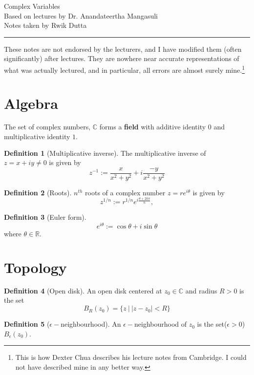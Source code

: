 \documentclass[10pt, a4paper]{extarticle}
\theoremstyle{definition}
\newtheorem{defn}{Definition}
\begin{document}
	\begin{center}
		\fontsize{25}{60}\selectfont Complex Variables \\
		\large Based on lectures by Dr. Anandateertha Mangasuli\\
		Notes taken by Rwik Dutta
	\end{center}
	\hrule
	\begin{center}
		These notes are not endorsed by the lecturers, and I have modified them (often
significantly) after lectures. They are nowhere near accurate representations of what
was actually lectured, and in particular, all errors are almost surely mine.\footnote[1]{This is how Dexter Chua describes his lecture notes from Cambridge. I could not have described mine in any better way.}
	\end{center}
	\tableofcontents
	
	\newpage

	\section{Algebra}
	The set of complex numbers, $\mathbb{C}$ forms a \textbf{field} with additive identity $0$ and multiplicative identity $1$.
	
	\begin{defn}[Multiplicative inverse]
	The multiplicative inverse of $z=x+iy\neq 0$ is given by
	\[z^{-1}:=\frac{x}{x^2+y^2}+i\frac{-y}{x^2+y^2}\]
	\end{defn}
	
	\begin{defn}[Roots]
	$n^{th}$ roots of a complex number $z=re^{i\theta}$ is given by
	\[z^{1/n}:=r^{1/n}e^{i\frac{\theta+2k\pi}{n}},\tag*{($k\in \langle n\rangle)$}\]
	\end{defn}
	
	\begin{defn}[Euler form]
		\[e^{i\theta}:=\cos\theta+i\sin\theta\]
		where $\theta\in\mathbb{R}$.
	\end{defn}

	\section{Topology}
	\begin{defn}[Open disk]
		An open disk centered at $z_0\in\mathbb{C}$ and radius $R>0$ is the set
		\[B_R(z_0)=\{z\ |\ |z-z_0|< R\}\]
	\end{defn}
	
	\begin{defn}[$\epsilon-$neighbourhood]
	An $\epsilon-$neighbourhood of $z_0$ is the set($\epsilon>0$) $B_\epsilon(z_0)$.
	\end{defn}
	
\end{document}
